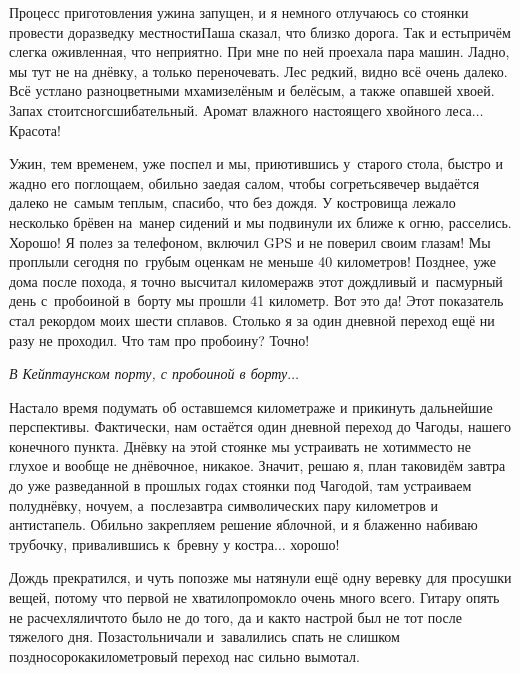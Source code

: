 Процесс приготовления ужина запущен, и я немного отлучаюсь со стоянки провести доразведку местности\mdash Паша сказал, что близко дорога. Так и есть\mdash причём слегка оживленная, что неприятно. При мне по ней проехала пара машин. Ладно, мы тут не на днёвку, а только переночевать. Лес редкий, видно всё очень далеко. Всё устлано разноцветными мхами\mdash зелёным и белёсым, а также опавшей хвоей. Запах стоит\mdash сногсшибательный. Аромат влажного настоящего хвойного леса$\ldots$ Красота!

Ужин, тем временем, уже поспел и мы, приютившись у~старого стола, быстро и жадно его поглощаем, обильно заедая салом, чтобы согреться\mdash вечер выдаётся далеко не~самым теплым, спасибо, что без дождя. У костровища лежало несколько брёвен на~манер сидений и мы подвинули их ближе к огню, расселись. Хорошо! Я полез за телефоном, включил GPS и не поверил своим глазам! Мы проплыли сегодня по~грубым оценкам не меньше 40 километров! Позднее, уже дома после похода, я точно высчитал киломераж\mdash в этот дождливый и~пасмурный день с~пробоиной в~борту мы прошли 41 километр. Вот это да! Этот показатель стал рекордом моих шести сплавов. Столько я за один дневной переход ещё ни разу не проходил. Что там про пробоину? Точно! 

\vspace{0.1cm}
\noindent\textit{%
	\hspace*{1.0cm}В Кейптаунском порту, с пробоиной в борту$\ldots$
}
\vspace{0.1cm}

Настало время подумать об оставшемся километраже и прикинуть дальнейшие перспективы. Фактически, нам остаётся один дневной переход до Чагоды, нашего конечного пункта. Днёвку на этой стоянке мы устраивать не хотим\mdash место не глухое и вообще не днёвочное, никакое. Значит, решаю я, план таков\mdash идём завтра до уже разведанной в прошлых годах стоянки под Чагодой, там устраиваем полуднёвку, ночуем, а~послезавтра символических пару километров и антистапель. Обильно закрепляем решение яблочной, и я блаженно набиваю трубочку, привалившись к~бревну у костра$\ldots$ хорошо! 

Дождь прекратился, и чуть попозже мы натянули ещё одну веревку для просушки вещей, потому что первой не хватило\mdash промокло очень много всего. Гитару опять не расчехляли\mdash что\sdash то было не до того, да и как\sdash то настрой был не тот после тяжелого дня. Позастольничали и~завалились спать не слишком поздно\mdash сорокакилометровый переход нас сильно вымотал.

\begin{center}
\end{center}

